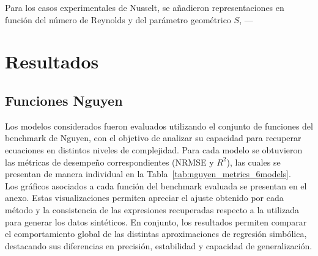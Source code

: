 Para los casos experimentales de Nusselt, se añadieron representaciones en función del número de Reynolds y del parámetro geométrico $S$, ---

\newpage
\section{Resultados}

\subsection{Funciones Nguyen}

Los modelos considerados fueron evaluados utilizando el conjunto de funciones del benchmark de Nguyen, con el objetivo de analizar su capacidad para recuperar ecuaciones en distintos niveles de complejidad. Para cada modelo se obtuvieron las métricas de desempeño correspondientes (NRMSE y $R^2$), las cuales se presentan de manera individual en la Tabla~\ref{tab:nguyen_metrics_6models}.\\

Los gráficos asociados a cada función del benchmark evaluada se presentan en el anexo. Estas visualizaciones permiten apreciar el ajuste obtenido por cada método y la consistencia de las expresiones recuperadas respecto a la utilizada para generar los datos sintéticos. En conjunto, los resultados permiten comparar el comportamiento global de las distintas aproximaciones de regresión simbólica, destacando sus diferencias en precisión, estabilidad y capacidad de generalización.\\

